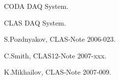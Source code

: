 





\begin{thebibliography}{99}


 CODA DAQ System. 

 CLAS DAQ System. 

 S.Pozdnyakov, CLAS-Note 2006-023. 

 C.Smith, CLAS12-Note 2007-xxx. 

 K.Mikhailov, CLAS-Note 2007-009. 


\end{thebibliography}
